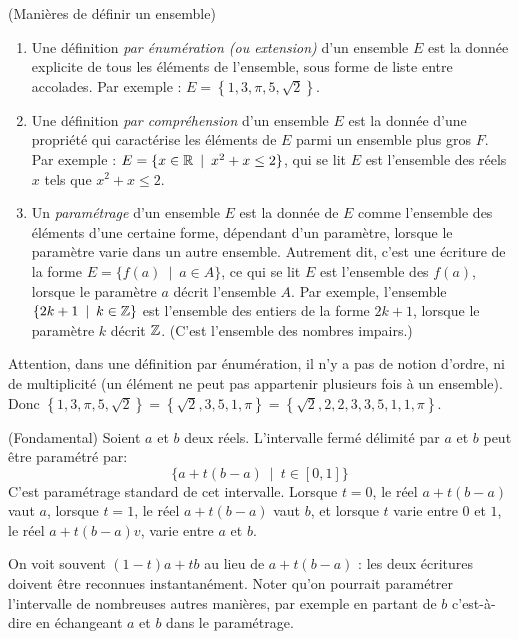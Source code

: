 \begin{definition}(Manières de définir un ensemble)

\begin{enumerate}
\item Une définition \emph{par énumération (ou extension)} d'un ensemble $E$ est la donnée explicite de tous les éléments de l'ensemble, sous forme de liste entre accolades. Par exemple : $E = \left\{1,3,\pi,5,\sqrt2\right\}$.
\item Une définition \emph{par compréhension} d'un ensemble $E$ est la donnée d'une propriété qui caractérise les éléments de $E$ parmi un ensemble plus gros $F$. Par exemple : $E = \{x\in \R\:\mid\: x^2+x\leq 2\}$, qui se lit \og$E$ est l'ensemble des réels $x$ tels que $x^2+x\leq 2$\fg.
\item Un \emph{paramétrage} d'un ensemble $E$ est la donnée de $E$ comme l'ensemble des éléments d'une certaine forme, dépendant d'un paramètre, lorsque le paramètre varie dans un autre ensemble. Autrement dit, c'est une écriture de la forme $E = \{f(a)\:\mid\: a\in A\}$, ce qui se lit \og $E$ est l'ensemble des $f(a)$, lorsque le paramètre $a$ décrit l'ensemble $A$\fg. Par exemple, l'ensemble $\{2k+1\:\mid\: k\in \Z\}$ est l'ensemble des entiers de la forme $2k+1$, lorsque le paramètre $k$ décrit $\mathbb{Z}$. (C'est l'ensemble des nombres impairs.)
\end{enumerate}
\end{definition}

Attention, dans une définition par énumération, il n'y a pas de notion d'ordre, ni de multiplicité (un élément ne peut pas appartenir \og plusieurs fois\fg{} à un ensemble). Donc  $\left\{1,3,\pi,5,\sqrt2\right\} = \left\{\sqrt 2, 3,5,1,\pi\right\}=\left\{\sqrt 2,2, 2, 3,  3,5,1,1,\pi\right\}$.


\begin{exemple} (Fondamental)
Soient $a$ et $b$ deux réels. L'intervalle fermé délimité par $a$ et $b$ peut être paramétré par:
\[ \{a+t(b-a)\:\mid\: t\in [0,1]\}\]
C'est paramétrage standard de cet intervalle. Lorsque $t=0$, le réel $a+t(b-a)$ vaut $a$, lorsque $t=1$, le réel $a+t(b-a)$ vaut $b$, et lorsque $t$ varie entre $0$ et $1$, le réel $a+t(b-a)v$, varie entre $a$ et $b$.

On voit souvent $(1-t)a+tb$ au lieu de $a+t(b-a)$ : les deux écritures doivent être reconnues instantanément. Noter qu'on pourrait paramétrer l'intervalle de nombreuses autres manières, par exemple en \og partant de $b$\fg{} c'est-à-dire en échangeant $a$ et $b$ dans le paramétrage.
\end{exemple}

